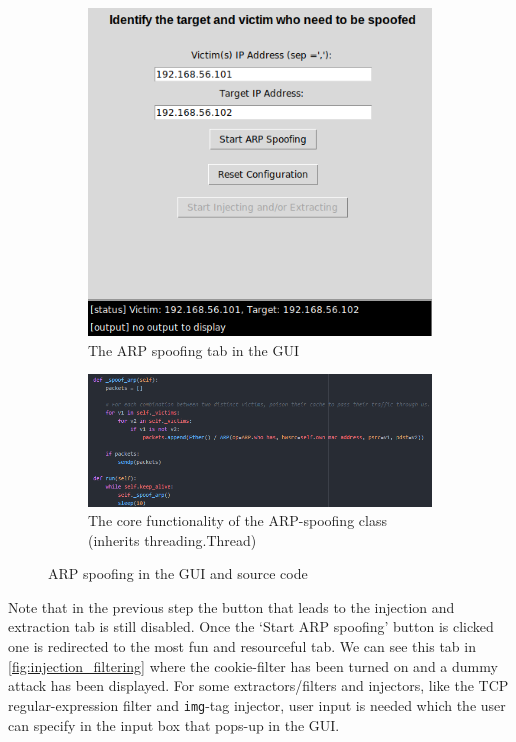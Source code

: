\begin{figure}[t!]
	\centering
	\begin{subfigure}{0.51\textwidth}
	\includegraphics[width=\textwidth]{img/arp_spoofing.png}
		\caption{The ARP spoofing tab in the GUI}
	\end{subfigure}

	\begin{subfigure}{0.51\textwidth}
		\includegraphics[width=\textwidth]{img/arp_spoof_code}
		\caption{The core functionality of the ARP-spoofing class (inherits threading.Thread)}
	\end{subfigure}
\caption{
	ARP spoofing in the GUI and source code}
	\label{fig:arp_spoof}
\end{figure}


\newpage 
Note that in the previous step the button that leads to the injection and extraction tab is still disabled. Once the `Start ARP spoofing' button is clicked one is redirected to the most fun and resourceful tab. We can see this tab in \autoref{fig:injection_filtering} where the cookie-filter has been turned on and a dummy attack has been displayed. For some extractors/filters and injectors, like the TCP regular-expression filter and \texttt{img}-tag injector, user input is needed which the user can specify in the input box that pops-up in the GUI.\\

